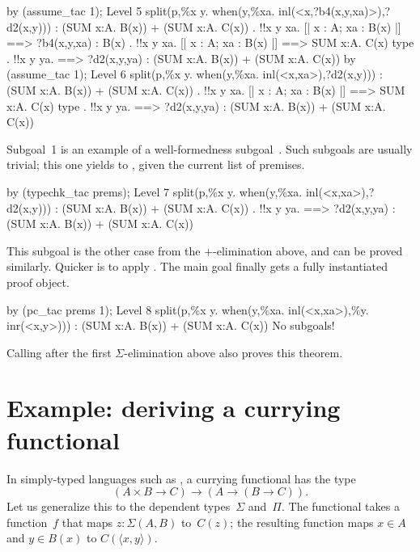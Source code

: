 \begin{ttbox}
by (assume_tac 1);
{\out Level 5}
{\out split(p,\%x y. when(y,\%xa. inl(<x,?b4(x,y,xa)>),?d2(x,y)))}
{\out : (SUM x:A. B(x)) + (SUM x:A. C(x))}
\ttbreak
{. !!x y xa. [| x : A; xa : B(x) |] ==> ?b4(x,y,xa) : B(x)}
{. !!x y xa. [| x : A; xa : B(x) |] ==> SUM x:A. C(x) type}
{. !!x y ya.}
{\out        [| x : A; ya : C(x) |] ==>}
{\out        ?d2(x,y,ya) : (SUM x:A. B(x)) + (SUM x:A. C(x))}
\ttbreak
by (assume_tac 1);
{\out Level 6}
{\out split(p,\%x y. when(y,\%xa. inl(<x,xa>),?d2(x,y)))}
{\out : (SUM x:A. B(x)) + (SUM x:A. C(x))}
{. !!x y xa. [| x : A; xa : B(x) |] ==> SUM x:A. C(x) type}
{. !!x y ya.}
{\out        [| x : A; ya : C(x) |] ==>}
{\out        ?d2(x,y,ya) : (SUM x:A. B(x)) + (SUM x:A. C(x))}
\end{ttbox}
Subgoal~1 is an example of a well-formedness subgoal~\cite{constable86}.
Such subgoals are usually trivial; this one yields to
, given the current list of premises.
\begin{ttbox}
by (typechk_tac prems);
{\out Level 7}
{\out split(p,\%x y. when(y,\%xa. inl(<x,xa>),?d2(x,y)))}
{\out : (SUM x:A. B(x)) + (SUM x:A. C(x))}
{. !!x y ya.}
{\out        [| x : A; ya : C(x) |] ==>}
{\out        ?d2(x,y,ya) : (SUM x:A. B(x)) + (SUM x:A. C(x))}
\end{ttbox}
This subgoal is the other case from the $+$-elimination above, and can be
proved similarly.  Quicker is to apply .  The main goal
finally gets a fully instantiated proof object.
\begin{ttbox}
by (pc_tac prems 1);
{\out Level 8}
{\out split(p,\%x y. when(y,\%xa. inl(<x,xa>),\%y. inr(<x,y>)))}
{\out : (SUM x:A. B(x)) + (SUM x:A. C(x))}
{\out No subgoals!}
\end{ttbox}
Calling  after the first $\Sigma$-elimination above also
proves this theorem.


\section{Example: deriving a currying functional}
In simply-typed languages such as {\ML}, a currying functional has the type 
\[ (A\times B \to C) \to (A\to (B\to C)). \]
Let us generalize this to the dependent types~$\Sigma$ and~$\Pi$.  
The functional takes a function~$f$ that maps $z:\Sigma(A,B)$
to~$C(z)$; the resulting function maps $x\in A$ and $y\in B(x)$ to
$C(\langle x,y\rangle)$.

